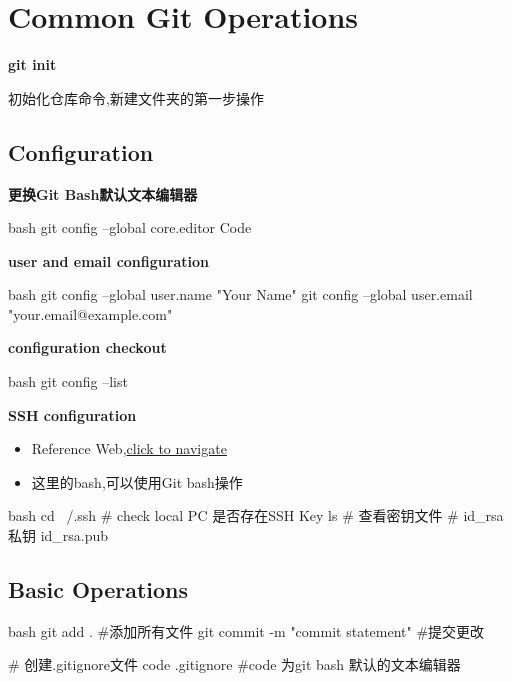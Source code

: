 \chapter{Common Git Operations}
\textbf{git init}

初始化仓库命令,新建文件夹的第一步操作

\section{Configuration}
\textbf{更换Git Bash默认文本编辑器}
\begin{myminted}{bash}
    git config --global core.editor Code
\end{myminted}

\textbf{user and email configuration}
\begin{myminted}{bash}
    git config --global user.name "Your Name"
    git config --global user.email "your.email@example.com"
\end{myminted}

\textbf{configuration checkout}
\begin{myminted}{bash}
    git config --list
\end{myminted}

\textbf{SSH configuration}
\begin{itemize}
    \item Reference Web,\href{https://blog.csdn.net/weixin_42310154/article/details/118340458}{click to navigate}
    \item 这里的bash,可以使用Git bash操作
\end{itemize}


\begin{myminted}{bash}
    cd ~/.ssh # check local PC 是否存在SSH Key
    ls # 查看密钥文件
    # id_rsa 私钥 id_rsa.pub 
\end{myminted}



\newpage
\section{Basic Operations}
\begin{myminted}{bash}
    git add . #添加所有文件
    git commit -m "commit statement" #提交更改

    # 创建.gitignore文件
    code .gitignore #code 为git bash 默认的文本编辑器
\end{myminted}



